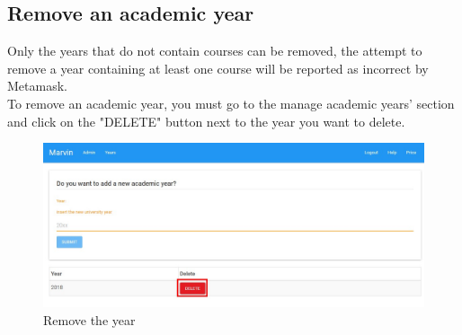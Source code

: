 \documentclass[ManualeUtente]{subfiles}
\begin{document}
\subsection{Remove an academic year}
Only the years that do not contain courses can be removed, the attempt to remove a year containing at least one course will be reported as incorrect by Metamask.\\
To remove an academic year, you must go to the manage academic years' section and click on the "DELETE" button next to the year you want to delete.
\begin{figure}[H]
	\centering
	\includegraphics[width=0.7\linewidth]{image/UniversityRemoveYear1}
	\caption[Add year form]{Remove the year}
	\label{fig:Remove the year}
\end{figure}
\end{document}
